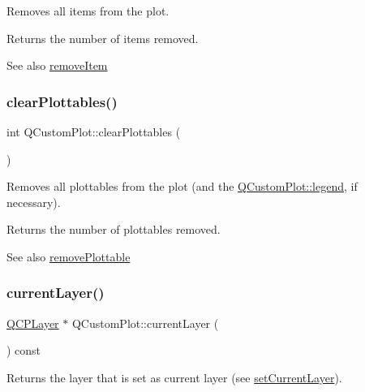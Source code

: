 Removes all items from the plot.

Returns the number of items removed.

\begin{DoxySeeAlso}{See also}
\mbox{\hyperlink{class_q_custom_plot_ae04446557292551e8fb6e2c106e1848d}{remove\+Item}} 
\end{DoxySeeAlso}
\mbox{\label{class_q_custom_plot_a9a409bb3201878adb7ffba1c89c4e004}} 
\subsubsection{\texorpdfstring{clear\+Plottables()}{clearPlottables()}}
{\footnotesize\ttfamily int Q\+Custom\+Plot\+::clear\+Plottables (\begin{DoxyParamCaption}{ }\end{DoxyParamCaption})}

Removes all plottables from the plot (and the \mbox{\hyperlink{class_q_custom_plot_a4eadcd237dc6a09938b68b16877fa6af}{Q\+Custom\+Plot\+::legend}}, if necessary).

Returns the number of plottables removed.

\begin{DoxySeeAlso}{See also}
\mbox{\hyperlink{class_q_custom_plot_af3dafd56884208474f311d6226513ab2}{remove\+Plottable}} 
\end{DoxySeeAlso}
\mbox{\label{class_q_custom_plot_a0421d647f420b0b4c57aec1708857af5}} 
\subsubsection{\texorpdfstring{current\+Layer()}{currentLayer()}}
{\footnotesize\ttfamily \mbox{\hyperlink{class_q_c_p_layer}{Q\+C\+P\+Layer}} $\ast$ Q\+Custom\+Plot\+::current\+Layer (\begin{DoxyParamCaption}{ }\end{DoxyParamCaption}) const}

Returns the layer that is set as current layer (see \mbox{\hyperlink{class_q_custom_plot_a73a6dc47c653bb6f8f030abca5a11852}{set\+Current\+Layer}}). \mbox{\label{class_q_custom_plot_a9d4808ab925b003054085246c92a257c}} 
